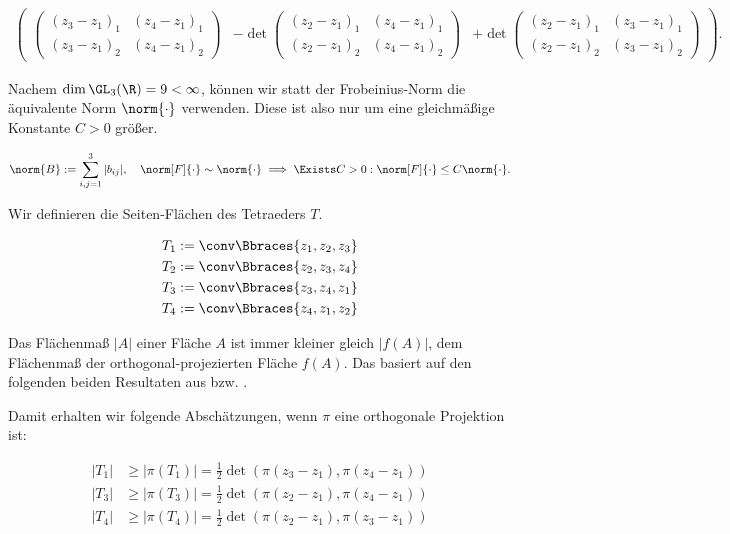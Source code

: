 \begin{solution}
\begin{multline*}
\begin{pmatrix}
\begin{pmatrix}
      (z_3 - z_1)_1 & (z_4 - z_1)_1 \\
      (z_3 - z_1)_2 & (z_4 - z_1)_2
    \end{pmatrix}
    &
    -
    \det
    \begin{pmatrix}
      (z_2 - z_1)_1 & (z_4 - z_1)_1 \\
      (z_2 - z_1)_2 & (z_4 - z_1)_2
    \end{pmatrix}
    &
    +
    \det
    \begin{pmatrix}
      (z_2 - z_1)_1 & (z_3 - z_1)_1 \\
      (z_2 - z_1)_2 & (z_3 - z_1)_2
    \end{pmatrix}
  \end{pmatrix}.
\end{multline*}

Nachem $\dim \GL_3(\R) = 9 < \infty$, können wir statt der Frobeinius-Norm die äquivalente Norm $\norm{\cdot}$ verwenden.
Diese ist also nur um eine gleichmäßige Konstante $C > 0$ größer.

\begin{align*}
  \norm{B}
  :=
  \sum_{i,j=1}^3 |b_{ij}|,
  \quad
  \norm[F]{\cdot}
  \sim
  \norm{\cdot}
  \implies
  \Exists C > 0:
  \norm[F]{\cdot}
  \leq
  C \norm{\cdot}.
\end{align*}

Wir definieren die Seiten-Flächen des Tetraeders $T$.

\begin{align*}
  T_1 & := \conv \Bbraces{z_1, z_2, z_3} \\
  T_2 & := \conv \Bbraces{z_2, z_3, z_4} \\
  T_3 & := \conv \Bbraces{z_3, z_4, z_1} \\
  T_4 & := \conv \Bbraces{z_4, z_1, z_2}
\end{align*}

Das Flächenmaß $|A|$ einer Fläche $A$ ist immer kleiner gleich $|f(A)|$, dem Flächenmaß der orthogonal-projezierten Fläche $f(A)$.
Das basiert auf den folgenden beiden Resultaten aus \cite{Ana3} bzw. \cite{FAna1}.


Damit erhalten wir folgende Abschätzungen, wenn $\pi$ eine orthogonale Projektion ist:

\begin{align*}
  |T_1| & \geq |\pi(T_1)| = \frac{1}{2} \det(\pi(z_3 - z_1), \pi (z_4 - z_1)) \\
  |T_3| & \geq |\pi(T_3)| = \frac{1}{2} \det(\pi(z_2 - z_1), \pi (z_4 - z_1)) \\
  |T_4| & \geq |\pi(T_4)| = \frac{1}{2} \det(\pi(z_2 - z_1), \pi (z_3 - z_1))
\end{align*}


\end{solution}
